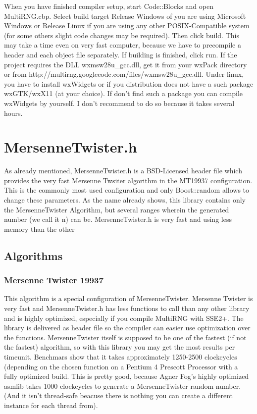 \documentclass{scrartcl}
\begin{document}
When you have finished compiler setup, start Code::Blocks and open MultiRNG.cbp. Select build target Release Windows of you are using Microsoft Windows or Release Linux if you are using any other POSIX-Compatible system (for some others slight code changes may be required). Then click build. This may take a time even on very fast computer, because we have to precompile a header and each object file separately. If building is finished, click run. If the project requires the DLL wxmsw28u\_gcc.dll, get it from your wxPack directory or from http://multirng.googlecode.com/files/wxmsw28u\_gcc.dll. Under linux, you have to install wxWidgets or if you distribution does not have a such package wxGTK/wxX11 (at your choice). If don't find such a package you can compile wxWidgets by yourself. I don't recommend to do so because it takes several hours.
\section{MersenneTwister.h}
As already mentioned, MersenneTwister.h is a BSD-Licensed header file which provides the very fast Mersenne Twsiter algorithm in the MT19937 configuration. This is the commonly most used configuration and only Boost::random allows to change these parameters. As the name already shows, this library contains only the MersenneTwister Algorithm, but several ranges wherein the generated number (we call it n) can be. MersenneTwister.h is very fast and using less memory than the other 
\subsection{Algorithms}
\subsubsection{Mersenne Twister 19937}
This algorithm is a special configuration of MersenneTwister. Mersenne Twister is very fast and MersenneTwister.h has less functions to call than any other library and is highly optimized, especially if you compile MultiRNG with SSE2+. The library is delivered as header file so the compiler can easier use optimization over the functions. MersenneTwister itself is supposed to be one of the fastest (if not the fastest) algorithm, so with this library you may get the most results per timeunit. Benchmars show that it takes approximately 1250-2500 clockcycles (depending on the chosen function on a Pentium 4 Prescott Processor with a fully optimized build. This is pretty good, because Agner Fog's highly optimized asmlib takes 1000 clockcycles to generate a MersenneTwister random number. (And it isn't thread-safe beacuse there is nothing you can create a different instance for each thread from).
\end{document}
